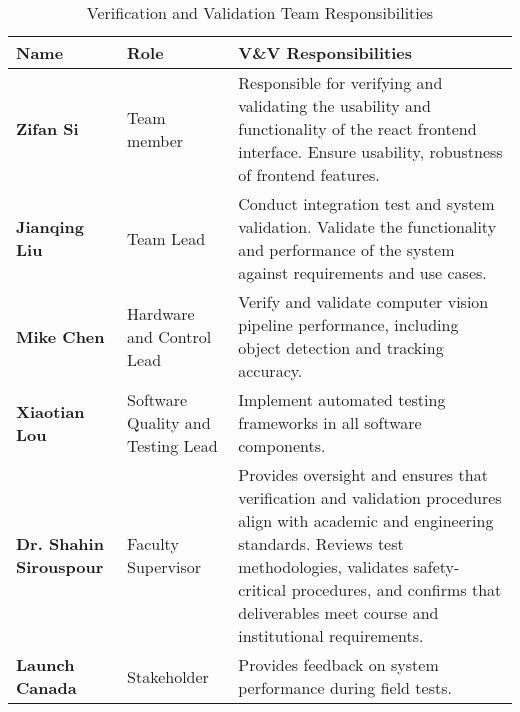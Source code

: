 \documentclass[12pt, titlepage]{article}
\begin{document}
\begin{table}[H]
  \centering
  \caption{Verification and Validation Team Responsibilities}
  \label{tab:vnv_team}
  \begin{tabular}{|p{3.5cm}|p{3.5cm}|p{8cm}|}
    \hline
    \textbf{Name}                  & \textbf{Role}                     & \textbf{V\&V Responsibilities} \\ \hline

    \textbf{Zifan Si}              & Team member                       &
    Responsible for verifying and validating the usability and functionality of the
    react frontend interface.
    Ensure usability, robustness of frontend features.                                                  \\ \hline

    \textbf{Jianqing Liu}          & Team Lead                         &
    Conduct integration test and system validation. Validate the functionality and
    performance of the system against requirements and use cases.                                       \\ \hline

    \textbf{Mike Chen}             & Hardware and Control Lead         &
    Verify and validate computer vision pipeline performance, including object detection
    and tracking accuracy.                                                                              \\ \hline

    \textbf{Xiaotian Lou}          & Software Quality and Testing Lead &
    Implement automated testing frameworks in all software components.                                  \\ \hline

    \textbf{Dr. Shahin Sirouspour} & Faculty Supervisor                &
    Provides oversight and ensures that verification and validation procedures
    align with academic and engineering standards.
    Reviews test methodologies, validates safety-critical procedures, and
    confirms that deliverables meet course and institutional requirements.                              \\ \hline

    \textbf{Launch Canada}         & Stakeholder                       &
    Provides feedback on system performance during field tests.
    \\ \hline

  \end{tabular}
\end{table}
\end{document}
